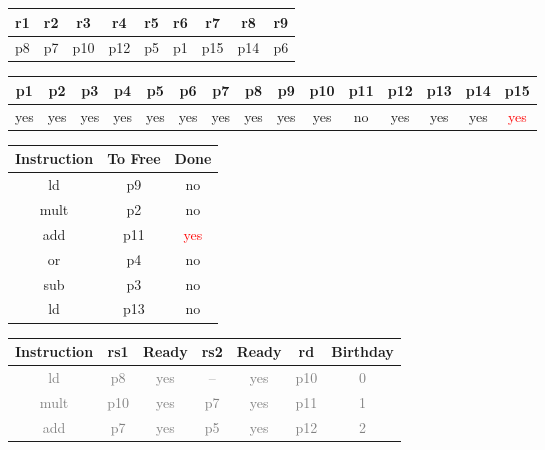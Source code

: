 \documentclass[12pt]{article}
\begin{document}
\begin{enumerate}
\begin{table}[H]
\begin{tabular}{|c|c|c|c|c|c|c|c|c|c|c|c|c|}
					\hline 
				\end{tabular}
			\end{table}
			\begin{table}[H]
				\begin{tabular}{|c|c|c|c|c|c|c|c|c|}
					\hline
					r1 & r2 & r3 & r4 & r5 & r6 & r7 & r8 & r9\\
					\hline
					p8 & p7 & p10 & p12 & p5 & p1 & p15 & p14 & p6\\
					\hline
				\end{tabular}
			\end{table}
			\begin{table}[H]
				\begin{tabular}{|c|c|c|c|c|c|c|c|c|c|c|c|c|c|c|}
					\hline
					p1 & p2 & p3 & p4 & p5 & p6 & p7 & p8 & p9 & p10 & p11 & p12 & p13 & p14 & p15\\
					\hline
					yes & yes & yes & yes & yes & yes & yes & yes & yes & yes & no & yes & yes & yes & \textcolor{red}{yes}\\
					\hline
				\end{tabular}
			\end{table}
			\begin{table}[H]
				\begin{tabular}{|c|c|c|}
					\hline
					Instruction & To Free & Done\\
					\hline
					ld & p9 & no\\
					\hline
					mult & p2 & no\\
					\hline
					add & p11 & \textcolor{red}{yes}\\
					\hline
					or & p4 & no\\
					\hline
					sub & p3 & no\\
					\hline
					ld & p13 & no\\
					\hline
				\end{tabular}
				\hfill
				\begin{tabular}{|c|c|c|c|c|c|c|}
					\hline
					Instruction & rs1 & Ready & rs2 & Ready & rd & Birthday\\
					\hline
					\textcolor{gray}{ld} & \textcolor{gray}{p8} & \textcolor{gray}{yes} & \textcolor{gray}{--} & \textcolor{gray}{yes} & \textcolor{gray}{p10} & \textcolor{gray}{0}\\
					\hline
					\textcolor{gray}{mult} & \textcolor{gray}{p10} & \textcolor{gray}{yes} & \textcolor{gray}{p7} & \textcolor{gray}{yes} & \textcolor{gray}{p11} & \textcolor{gray}{1}\\
					\hline
					\textcolor{gray}{add} & \textcolor{gray}{p7} & \textcolor{gray}{yes} & \textcolor{gray}{p5} & \textcolor{gray}{yes} & \textcolor{gray}{p12} & \textcolor{gray}{2}\\

\end{tabular}
\end{table}
\end{enumerate}
\end{document}
